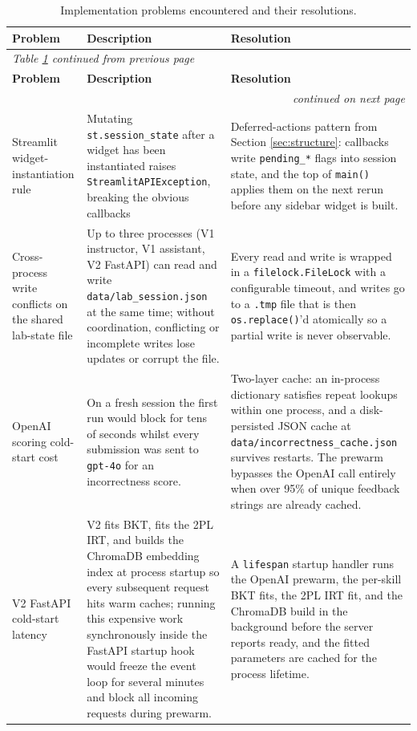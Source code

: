 {\small
\begin{longtable}{|p{}|p{}|p{}|}
\caption{Implementation problems encountered and their resolutions.} \label{tab:problems} \\
\hline
\textbf{Problem} & \textbf{Description} & \textbf{Resolution} \\
\hline\hline
\endfirsthead
\multicolumn{3}{l}{\textit{Table \ref{tab:problems} continued from previous page}} \\
\hline
\textbf{Problem} & \textbf{Description} & \textbf{Resolution} \\
\hline\hline
\endhead
\hline
\multicolumn{3}{r}{\textit{continued on next page}} \\
\endfoot
\hline
\endlastfoot

Streamlit widget-instantiation rule & Mutating \texttt{st.session\_state} after a widget has been instantiated raises \texttt{StreamlitAPIException}, breaking the obvious callbacks & Deferred-actions pattern from Section \ref{sec:structure}: callbacks write \texttt{pending\_*} flags into session state, and the top of \texttt{main()} applies them on the next rerun before any sidebar widget is built. \\
\hline
Cross-process write conflicts on the shared lab-state file & Up to three processes (V1 instructor, V1 assistant, V2 FastAPI) can read and write \texttt{data/lab\_session.json} at the same time; without coordination, conflicting or incomplete writes lose updates or corrupt the file. & Every read and write is wrapped in a \texttt{filelock.FileLock} with a configurable timeout, and writes go to a \texttt{.tmp} file that is then \texttt{os.replace()}'d atomically so a partial write is never observable. \\
\hline
OpenAI scoring cold-start cost & On a fresh session the first run would block for tens of seconds whilst every submission was sent to \texttt{gpt-4o} for an incorrectness score. & Two-layer cache: an in-process dictionary satisfies repeat lookups within one process, and a disk-persisted JSON cache at \texttt{data/incorrectness\_cache.json} survives restarts. The prewarm bypasses the OpenAI call entirely when over 95\% of unique feedback strings are already cached. \\
\hline
V2 FastAPI cold-start latency & V2 fits BKT, fits the 2PL IRT, and builds the ChromaDB embedding index at process startup so every subsequent request hits warm caches; running this expensive work synchronously inside the FastAPI startup hook would freeze the event loop for several minutes and block all incoming requests during prewarm. & A \texttt{lifespan} startup handler runs the OpenAI prewarm, the per-skill BKT fits, the 2PL IRT fit, and the ChromaDB build in the background before the server reports ready, and the fitted parameters are cached for the process lifetime. \\

\end{longtable}}

